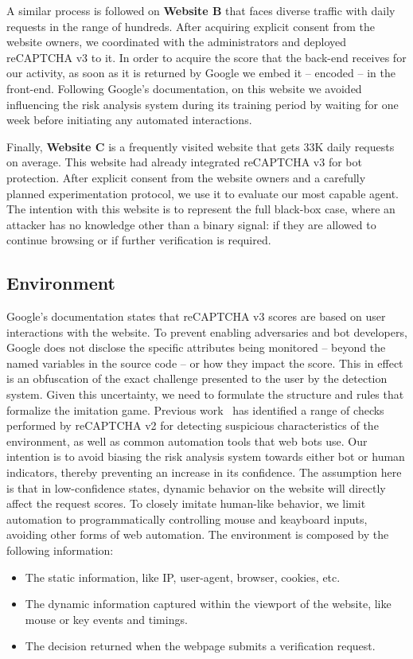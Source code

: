 A similar process is followed on \textbf{Website B} that faces diverse traffic with daily requests in the range of hundreds.
After acquiring explicit consent from the website owners, we coordinated with the administrators and deployed reCAPTCHA v3 to it.
In order to acquire the score that the back-end receives for our activity, as soon as it is returned by Google we embed it -- encoded -- in the front-end.
Following Google's documentation, on this website we avoided influencing the risk analysis system during its training period by waiting for one week before initiating any automated interactions.

Finally, \textbf{Website C} is a frequently visited website that gets 33K daily requests on average.
This website had already integrated reCAPTCHA v3 for bot protection.
After explicit consent from the website owners and a carefully planned experimentation protocol, we use it to evaluate our most capable agent.
The intention with this website is to represent the full black-box case, where an attacker has no knowledge other than a binary signal: if they are allowed to continue browsing or if further verification is required.


\subsection{Environment}

Google’s documentation states that reCAPTCHA v3 scores are based on user interactions with the website.
To prevent enabling adversaries and bot developers, Google does not disclose the specific attributes being monitored -- beyond the named variables in the source code -- or how they impact the score.
This in effect is an obfuscation of the exact challenge presented to the user by the detection system.
Given this uncertainty, we need to formulate the structure and rules that formalize the imitation game.
Previous work~\cite{sivakorn2016robot, li2021good} has identified a range of checks performed by reCAPTCHA v2 for detecting suspicious characteristics of the environment, as well as common automation tools that web bots use.
Our intention is to avoid biasing the risk analysis system towards either bot or human indicators, thereby preventing an increase in its confidence.
The assumption here is that in low-confidence states, dynamic behavior on the website will directly affect the request scores. 
To closely imitate human-like behavior, we limit automation to programmatically controlling mouse and keayboard inputs, avoiding other forms of web automation.
The environment is composed by the following information:
\begin{itemize}
  \item The static information, like IP, user-agent, browser, cookies, etc.
  \item The dynamic information captured within the viewport of the website, like mouse or key events and timings.
  \item The decision returned when the webpage submits a verification request.
 \end{itemize}

